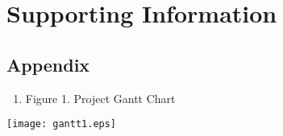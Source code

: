 \documentclass[10pt, onecolumn, draftclsnofoot, letterpaper, compsoc]{IEEEtran}
\begin{document}
\newpage
\section{Supporting Information}

\subsection{Appendix}

\begin{enumerate}
	\item Figure 1. Project Gantt Chart 
\end{enumerate}

\begin{center}
	\texttt{[image: gantt1.eps]}
\end{center}
\end{document}
